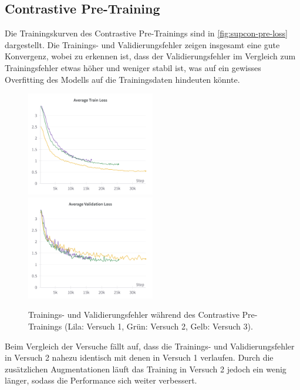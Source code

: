 \subsection{Contrastive Pre-Training} \label{subsec:supcon-pre-results}

Die Trainingskurven des Contrastive Pre-Trainings sind in \autoref{fig:supcon-pre-loss} dargestellt. Die Trainings- und Validierungsfehler zeigen insgesamt eine gute Konvergenz, wobei zu erkennen ist, dass der Validierungsfehler im Vergleich zum Trainingsfehler etwas höher und weniger stabil ist, was auf ein gewisses Overfitting des Modells auf die Trainingsdaten hindeuten könnte.

\begin{figure}[h]
	\centering
	\includegraphics[width=0.5\textwidth]{images/figure_results_supcon-pre_avg-train-loss.png}%
	\includegraphics[width=0.5\textwidth]{images/figure_results_supcon-pre_avg-val-loss.png}
	\caption[Trainings- und Validierungsfehler während des Contrastive Pre-Trainings.]{Trainings- und Validierungsfehler während des Contrastive Pre-Trainings (\textcolor{exp1}{Lila}: Versuch 1, \textcolor{exp2}{Grün}: Versuch 2, \textcolor{exp3}{Gelb}: Versuch 3).}
	\label{fig:supcon-pre-loss}
\end{figure}

Beim Vergleich der Versuche fällt auf, dass die Trainings- und Validierungsfehler in Versuch 2 nahezu identisch mit denen in Versuch 1 verlaufen. Durch die zusätzlichen Augmentationen läuft das Training in Versuch 2 jedoch ein wenig länger, sodass die Performance sich weiter verbessert.

